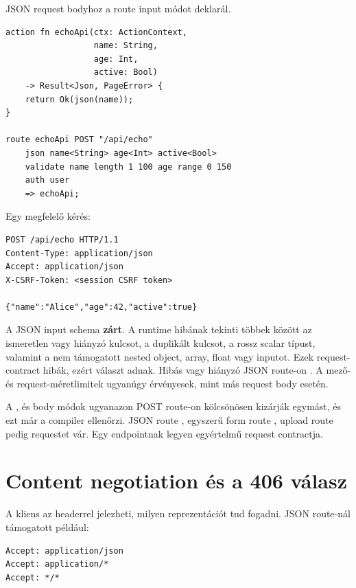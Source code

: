 JSON request bodyhoz a route  input módot deklarál.

\begin{lstlisting}[language=RWLang]
action fn echoApi(ctx: ActionContext,
                  name: String,
                  age: Int,
                  active: Bool)
    -> Result<Json, PageError> {
    return Ok(json(name));
}

route echoApi POST "/api/echo"
    json name<String> age<Int> active<Bool>
    validate name length 1 100 age range 0 150
    auth user
    => echoApi;
\end{lstlisting}

Egy megfelelő kérés:

\begin{lstlisting}
POST /api/echo HTTP/1.1
Content-Type: application/json
Accept: application/json
X-CSRF-Token: <session CSRF token>

{"name":"Alice","age":42,"active":true}
\end{lstlisting}

A JSON input schema \textbf{zárt}. A runtime hibának tekinti többek között az ismeretlen vagy hiányzó kulcsot, a duplikált kulcsot, a rossz scalar típust, valamint a nem támogatott nested object, array, float vagy  inputot. Ezek request-contract hibák, ezért  választ adnak. Hibás vagy hiányzó  JSON route-on . A mező- és request-méretlimitek ugyanúgy érvényesek, mint más request body esetén.

A ,  és  body módok ugyanazon POST route-on kölcsönösen kizárják egymást, és ezt már a compiler ellenőrzi. JSON route , egyszerű form route , upload route pedig  requestet vár. Egy endpointnak legyen egyértelmű request contractja.

\section{Content negotiation és a 406 válasz}

A kliens az  headerrel jelezheti, milyen reprezentációt tud fogadni. JSON route-nál támogatott például:

\begin{lstlisting}
Accept: application/json
Accept: application/*
Accept: */*
\end{lstlisting}

